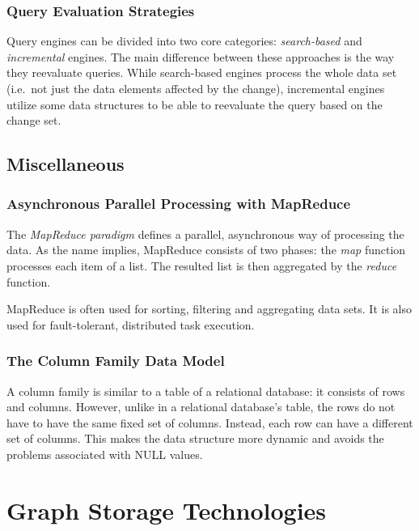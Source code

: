 \subsubsection{Query Evaluation Strategies}

Query engines can be divided into two core categories: \emph{search-based} and \emph{incremental} engines. The main difference between these approaches is the way they reevaluate queries. While search-based engines process the whole data set (i.e.\ not just the data elements affected by the change), incremental engines utilize some data structures to be able to reevaluate the query based on the change set.

\subsection{Miscellaneous}
\label{concepts-misc}

\subsubsection{Asynchronous Parallel Processing with MapReduce}

The \emph{MapReduce paradigm} defines a parallel, asynchronous way of processing the data. As the name implies, MapReduce consists of two phases: the \emph{map} function processes each item of a list. The resulted list is then aggregated by the \emph{reduce} function.

MapReduce is often used for sorting, filtering and aggregating data sets. It is also used for fault-tolerant, distributed task execution.

\subsubsection{The Column Family Data Model}

A column family is similar to a table of a relational database: it consists of rows and columns. However, unlike in a relational database's table, the rows do not have to have the same fixed set of columns. Instead, each row can have a different set of columns. This makes the data structure more dynamic and avoids the problems associated with NULL values.


\section{Graph Storage Technologies}
\label{graph-storage-technologies}

